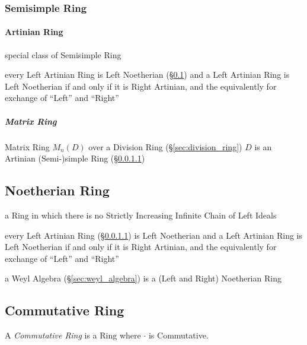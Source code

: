 \subsubsection{Semisimple Ring}\label{sec:semisimple_ring}

\paragraph{Artinian Ring}\label{sec:artinian_ring}\hfill

special class of Semisimple Ring

every Left Artinian Ring is Left Noetherian (\S\ref{sec:noetherian_ring}) and a
Left Artinian Ring is Left Noetherian if and only if it is Right Artinian, and
the equivalently for exchange of ``Left'' and ``Right''



\subparagraph{Matrix Ring}\label{sec:matrix_ring}\hfill

Matrix Ring $M_n(D)$ over a Division Ring (\S\ref{sec:division_ring}) $D$ is an
Artinian (Semi-)simple Ring (\S\ref{sec:artinian_ring})



\subsection{Noetherian Ring}\label{sec:noetherian_ring}

a Ring in which there is no Strictly Increasing Infinite Chain of Left Ideals

every Left Artinian Ring (\S\ref{sec:artinian_ring}) is Left Noetherian and a
Left Artinian Ring is Left Noetherian if and only if it is Right Artinian, and
the equivalently for exchange of ``Left'' and ``Right''

\fist a Weyl Algebra (\S\ref{sec:weyl_algebra}) is a (Left and Right)
Noetherian Ring



\subsection{Commutative Ring}\label{sec:commutative_ring}

A \emph{Commutative Ring} is a Ring where $\cdot$ is Commutative.

